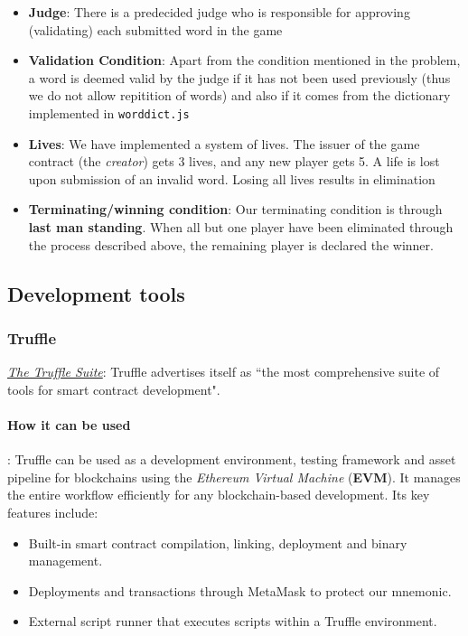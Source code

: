 \documentclass{article}
\begin{document}
\begin{itemize}
    \item[] \textbf{Judge}:
    There is a predecided judge who is responsible for approving (validating) each
    submitted word in the game
    \item[] \textbf{Validation Condition}:
    Apart from the condition mentioned in the problem, a word is deemed valid by the
    judge if it has not been used previously (thus we do not allow repitition of words)
    and also if it comes from the dictionary implemented in \verb|worddict.js|
    \item[] \textbf{Lives}:
    We have implemented a system of lives. The issuer of the game contract (the \textit{creator}) gets 3 lives, and any new player gets 5. A life is lost upon
    submission of an invalid word. Losing all lives results in elimination
    \item[] \textbf{Terminating/winning condition}: 
    Our terminating condition is through \textbf{last man standing}. When all but one
    player have been eliminated through the process described above, the remaining
    player is declared the winner.
\end{itemize}

\subsection{Development tools} 

\subsubsection{Truffle}

\href{https://trufflesuite.com/}{\textit{The Truffle Suite}}:
Truffle advertises itself as ``the most comprehensive suite of tools for smart
contract development". 
\paragraph{How it can be used}:
Truffle can be used as a development environment, testing framework and asset
pipeline for blockchains using the \emph{Ethereum Virtual Machine} (\textbf{EVM}).
It manages the entire workflow efficiently for any blockchain-based development.
Its key features include:
\begin{itemize}
    \item Built-in smart contract compilation, linking, deployment and binary management.
    \item Deployments and transactions through MetaMask to protect our mnemonic.
    \item External script runner that executes scripts within a Truffle environment.
\end{itemize}
\end{document}
